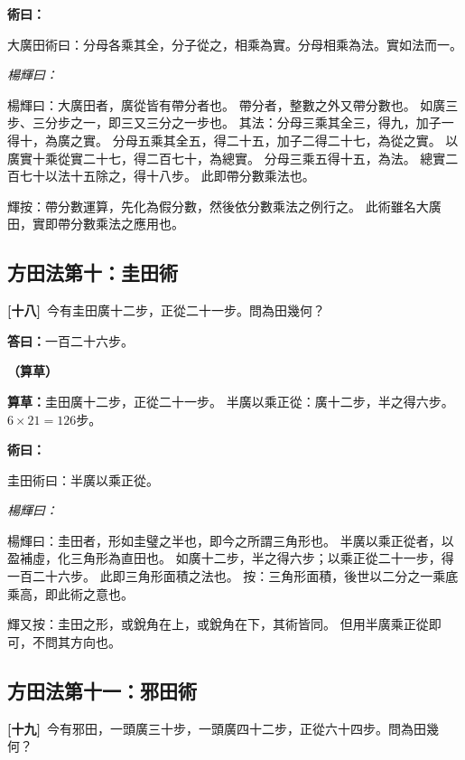 \documentclass[11pt,a4paper]{article}
\newenvironment{method}{%
  \par\noindent\textcolor{methodcolor}{\textbf{術曰：}}%
  \ignorespaces
}{\par\vspace{0.5em}}
\newenvironment{caocao}{%
  \par\noindent\textcolor{caocaocolor}{\small\textbf{（算草）}}%
  \ignorespaces
}{\par\vspace{0.5em}}
\newenvironment{yanghuicomment}{%
  \par\noindent\textcolor{commentarycolor}{\small\textit{楊輝曰：}}%
  \ignorespaces
}{\par\vspace{0.5em}}
\newcommand{\problemnum}[1]{\textbf{[\ignorespaces#1\unskip]}}
\begin{document}
\begin{method}
大廣田術曰：分母各乘其全，分子從之，相乘為實。分母相乘為法。實如法而一。
\end{method}

\begin{yanghuicomment}
楊輝曰：大廣田者，廣從皆有帶分者也。
帶分者，整數之外又帶分數也。
如廣三步、三分步之一，即三又三分之一步也。
其法：分母三乘其全三，得九，加子一得十，為廣之實。
分母五乘其全五，得二十五，加子二得二十七，為從之實。
以廣實十乘從實二十七，得二百七十，為總實。
分母三乘五得十五，為法。
總實二百七十以法十五除之，得十八步。
此即帶分數乘法也。

輝按：帶分數運算，先化為假分數，然後依分數乘法之例行之。
此術雖名大廣田，實即帶分數乘法之應用也。
\end{yanghuicomment}

\subsection{方田法第十：圭田術}

\noindent\problemnum{十八}\,
今有圭田廣十二步，正從二十一步。問為田幾何？

\noindent\textcolor{answercolor}{\textbf{答曰：}}一百二十六步。

\begin{caocao}
\textbf{算草：}圭田廣十二步，正從二十一步。
半廣以乘正從：廣十二步，半之得六步。
$6 \times 21 = 126$步。
\end{caocao}

\begin{method}
圭田術曰：半廣以乘正從。
\end{method}

\begin{yanghuicomment}
楊輝曰：圭田者，形如圭璧之半也，即今之所謂三角形也。
半廣以乘正從者，以盈補虛，化三角形為直田也。
如廣十二步，半之得六步；以乘正從二十一步，得一百二十六步。
此即三角形面積之法也。
按：三角形面積，後世以二分之一乘底乘高，即此術之意也。

輝又按：圭田之形，或銳角在上，或銳角在下，其術皆同。
但用半廣乘正從即可，不問其方向也。
\end{yanghuicomment}

\subsection{方田法第十一：邪田術}

\noindent\problemnum{十九}\,
今有邪田，一頭廣三十步，一頭廣四十二步，正從六十四步。問為田幾何？
\end{document}
